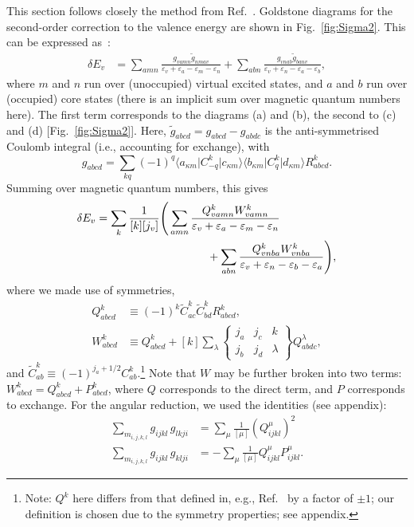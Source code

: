 \documentclass[10pt,twocolumn,a4paper]{article}%
\newcommand{\bra}[1]{\ensuremath{\langle #1|}}	%
\newcommand{\ket}[1]{\ensuremath{|#1\rangle}}	%
\newcommand{\sixj}[6]{\ensuremath{\begin{Bmatrix}#1&#2&#3\\#4&#5&#6\end{Bmatrix}}}	%
\newcommand{\be}{\begin{equation}}
\newcommand{\ee}{\end{equation}}
\def\en{\ensuremath{\varepsilon}}
\renewcommand{\k}{\ensuremath{\kappa}}
\begin{document}
This section follows closely the method from Ref.~\cite{DzubaHFS1984}.
Goldstone diagrams for the second-order correction to the valence energy are shown in Fig.~\ref{fig:Sigma2}.
This can be expressed as~\cite{DzubaHFS1984,JohnsonBook2007}:
\begin{align}\label{eq:dE-SO}
\delta E_v &=
\sum_{amn}
\frac{g_{vamn}\widetilde g_{nmav}}{\en_v+\en_a - \en_m-\en_n}
+\sum_{abn}
 \frac{g_{vnab}\widetilde g_{banv}}{\en_v+\en_n-\en_a-\en_b}  ,
\end{align}
where $m$ and $n$ run over (unoccupied) virtual excited states, and $a$ and $b$ run over (occupied) core states (there is an implicit sum over magnetic quantum numbers here).
The first term corresponds to the diagrams (a) and (b), the second to (c) and (d) [Fig.~\ref{fig:Sigma2}].
Here,
$ \widetilde g_{abcd} =  g_{abcd} -  g_{abdc}$
is the anti-symmetrised Coulomb integral (i.e., accounting for exchange), with
\be
 g_{abcd} = \sum_{kq} (-1)^q \bra{a_{\k m}}C^k_{-q}\ket{c_{\k m}} \bra{b_{\k m}}C^k_{q}\ket{d_{\k m}} R^k_{abcd}.
\ee
Summing over magnetic quantum numbers, this gives~\cite{DzubaHFS1984}
\begin{align}
\delta E_v &=\sum_k \frac{1}{[k][j_v]}\Bigg(
 \sum_{amn} \frac{Q^k_{vamn}W^k_{vamn}}{\en_v+\en_a - \en_m-\en_n}
\notag\\&\qquad\qquad\qquad\qquad\qquad
+\sum_{abn}\frac{Q^k_{vnba}W^k_{vnba}}{\en_v+\en_n-\en_b-\en_a}
 \Bigg),
\end{align}
where we made use of symmetries,
\begin{align}
Q^k_{abcd} &\equiv (-1)^k \widetilde C^k_{ac}\widetilde C^k_{bd}R^k_{abcd}, \\
W^k_{abcd} &\equiv Q^k_{abcd} + [k] \sum_\lambda \sixj{j_a}{j_c}{k}{j_b}{j_d}{\lambda}Q^\lambda_{abdc} ,
\end{align}
and
$\widetilde C^k_{ab}\equiv  (-1)^{j_a+1/2}  C^k_{ab}$.\footnote{Note: $Q^k$ here differs from that defined in, e.g., Ref.~\cite{DzubaHFS1984} by a factor of $\pm1$; our definition is chosen due to the symmetry properties; see appendix.}
Note that $W$ may be further broken into two terms:
$W^k_{abcd} = Q^k_{abcd} + P^k_{abcd}$, where $Q$ corresponds to the direct term, and $P$ corresponds to exchange.
For the angular reduction, we used the identities (see appendix):
\begin{align}
\sum_{m_{i,j,k,l}}  g_{ijkl} \, g_{lkji}
    &= \sum_\mu \frac{1}{[\mu]} \left( Q^\mu_{ijkl}\right)^2 \\
\sum_{m_{i,j,k,l}}  g_{ijkl} \,g_{klji}
    &=-\sum_\mu \frac{1}{[\mu]}  Q^\mu_{ijkl}P^\mu_{ijkl}.
\end{align}
\end{document}

